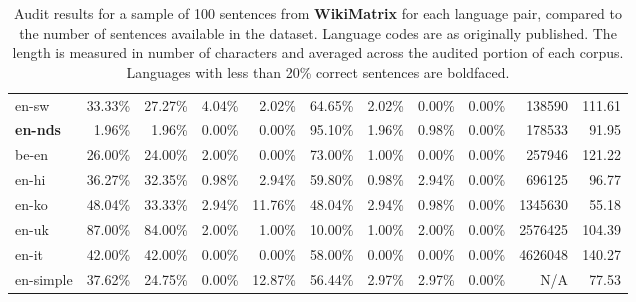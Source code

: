 \begin{table*}[hbt!]
{\begin{tabular}{l|rrrr|rrrr|rr}
            en-sw            & 33.33\% & 27.27\% & 4.04\% & 2.02\%  & 64.65\% & 2.02\%  & 0.00\% & 0.00\% & 138590       & 111.61            \\
            \textbf{en-nds}  & 1.96\%  & 1.96\%  & 0.00\% & 0.00\%  & 95.10\% & 1.96\%  & 0.98\% & 0.00\% & 178533       & 91.95             \\
            be-en            & 26.00\% & 24.00\% & 2.00\% & 0.00\%  & 73.00\% & 1.00\%  & 0.00\% & 0.00\% & 257946       & 121.22            \\
            en-hi            & 36.27\% & 32.35\% & 0.98\% & 2.94\%  & 59.80\% & 0.98\%  & 2.94\% & 0.00\% & 696125       & 96.77             \\
            en-ko            & 48.04\% & 33.33\% & 2.94\% & 11.76\% & 48.04\% & 2.94\%  & 0.98\% & 0.00\% & 1345630      & 55.18             \\
            en-uk            & 87.00\% & 84.00\% & 2.00\% & 1.00\%  & 10.00\% & 1.00\%  & 2.00\% & 0.00\% & 2576425      & 104.39            \\
            en-it            & 42.00\% & 42.00\% & 0.00\% & 0.00\%  & 58.00\% & 0.00\%  & 0.00\% & 0.00\% & 4626048      & 140.27            \\
            en-simple        & 37.62\% & 24.75\% & 0.00\% & 12.87\% & 56.44\% & 2.97\%  & 2.97\% & 0.00\% & N/A          & 77.53             \\
            \bottomrule
        \end{tabular}%
    }
    \caption{Audit results for a sample of 100 sentences from \textbf{WikiMatrix} for each language pair, compared to the number of sentences available in the dataset. Language codes are as originally published. The length is measured in number of characters and averaged across the audited portion of each corpus. Languages with less than 20\% correct sentences are boldfaced.}

    \label{tab:wikimatrix-full}
\end{table*}


